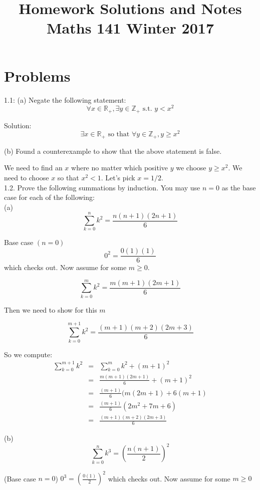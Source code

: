 \documentclass[16 pt]{amsart}
\theoremstyle{definition}
\theoremstyle{remark}
\numberwithin{equation}{subsection}
\newcommand{\R}{\mathbb{R}}
\newcommand{\Z}{\mathbb{Z}}
\begin{document}
\title{Homework Solutions and Notes\\ 
Maths 141 Winter 2017}
\maketitle 



\section{Problems}

1.1:  (a) Negate the following statement:
\[
\forall x\in \R_+, \exists y \in \Z_+ \text{ s.t. } y<x^2  
\]


Solution: 
\[
\exists x\in\R_+ \text{ so that } \forall y\in\Z_+, y\ge x^2
\]


(b) Found a counterexample to show that the above statement is false. 

We need to find an $x$ where no matter which positive $y$ we choose $y\ge x^2$.  We need to choose $x$ so that $x^2<1.$  Let's pick $x=1/2$.\\

1.2.  Prove the following summations by induction.  You may use $n=0$ as the base case for each of the following:\\

(a) 
\[
\sum_{k=0}^{n} k^2 = \frac{n(n+1)(2n+1)}{6}
\]

Base case $(n=0)$  
\[
0^2 = \frac{0(1)(1)}{6}
\]
which checks out.  Now assume for some $m\ge 0$.

\[
\sum_{k=0}^{m} k^2 = \frac{m(m+1)(2m+1)}{6}
\]

Then we need to show for this $m$

\[
\sum_{k=0}^{m+1} k^2 = \frac{(m+1)(m+2)(2m+3)}{6}
\]

So we compute:
\begin{eqnarray}
\sum_{k=0}^{m+1} k^2 & = & \sum_{k=0}^m k^2 + (m+1)^2\nonumber \\
& = & \frac{m(m+1)(2m+1)}{6} + (m+1)^2 \nonumber \\
& = & \frac{(m+1)}{6} (m(2m+1) + 6(m+1)\nonumber\\
& = & \frac{(m+1)}{6}(2m^2 + 7m + 6)\nonumber \\
& = & \frac{(m+1)(m+2)(2m+3)}{6} \nonumber
\end{eqnarray}


(b) 
\[
\sum_{k=0}^{n} k^3 = \left(\frac{n(n+1)}{2}\right)^2
\]


(Base case $n=0$) $0^3 = \left(\frac{0(1)}{2}\right)^2$ which checks out.  Now assume for some $m\ge0$
\end{document}
